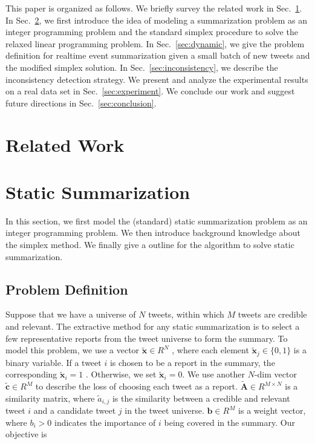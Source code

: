 \documentclass{llncs}
\begin{document}
This paper is organized as follows. We briefly survey the related work in Sec.~\ref{sec:related}. In Sec.~\ref{sec:static}, we first introduce the idea of modeling a summarization problem as an integer programming problem and the standard simplex procedure to solve the relaxed linear programming problem. In Sec.~\ref{sec:dynamic}, we give the problem definition for realtime event summarization given a small batch of new tweets and the modified simplex solution. In Sec.~\ref{sec:inconsistency}, we describe the inconsistency detection strategy. We present and analyze the experimental results on a real data set in Sec.~\ref{sec:experiment}. We conclude our work and suggest future directions in Sec.~\ref{sec:conclusion}.  

\section{Related Work}\label{sec:related}



\section{Static Summarization}\label{sec:static}
In this section, we first model the (standard) static summarization problem as an integer programming problem. We then introduce background knowledge about the simplex method. We finally give a outline for the algorithm to solve static summarization.
\subsection{Problem Definition}
Suppose that we have a universe of $N$ tweets, within which $M$ tweets are credible and relevant. The extractive method for any static summarization is to select a few representative reports from the tweet universe to form the summary. To model this problem, we use a vector $\tilde{\mathbf{x}}\in R^N$ , where each element $\tilde{\mathbf{x}}_j\in \{0,1\}$ is a binary variable. If a tweet $i$ is chosen to be a report in the summary, the corresponding $\tilde{\mathbf{x}}_i=1$ . Otherwise, we set  $\tilde{\mathbf{x}}_i=0$. We use another $N$-dim vector $\tilde{\mathbf{c}}\in R^M$ to describe the loss of choosing each tweet as a report. $\tilde{\mathbf{A}}\in R^{M\times N}$  is a similarity matrix, where $\tilde{a}_{i,j}$  is the similarity between a credible and relevant tweet $i$ and a candidate tweet $j$ in the tweet universe. $\mathbf{b}\in R^{M}$ is a weight vector, where $b_{i}>0$ indicates the importance of $i$ being covered in the summary. Our objective is 
\end{document}
